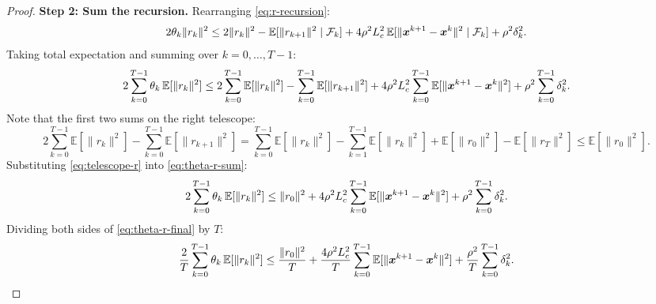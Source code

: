\documentclass[10pt]{article}
\begin{document}
\begin{proof}
\medskip\noindent\textbf{Step 2: Sum the recursion.}
Rearranging \eqref{eq:r-recursion}:
\begin{equation}
  2\theta_k\|r_k\|^2
  \leq 2\|r_k\|^2 - \mathbb{E}[\|r_{k+1}\|^2 \mid \mathcal{F}_k]
       + 4\rho^2 L_c^2\,\mathbb{E}[\|\bm{x}^{k+1}-\bm{x}^k\|^2 \mid \mathcal{F}_k]
       + \rho^2\delta_k^2.
\end{equation}
Taking total expectation and summing over $k = 0,\ldots,T-1$:
\begin{equation}\label{eq:theta-r-sum}
  2\sum_{k=0}^{T-1}\theta_k\,\mathbb{E}[\|r_k\|^2]
  \leq 2\sum_{k=0}^{T-1}\mathbb{E}[\|r_k\|^2]
       - \sum_{k=0}^{T-1}\mathbb{E}[\|r_{k+1}\|^2]
       + 4\rho^2 L_c^2\sum_{k=0}^{T-1}\mathbb{E}[\|\bm{x}^{k+1}-\bm{x}^k\|^2]
       + \rho^2\sum_{k=0}^{T-1}\delta_k^2.
\end{equation}
Note that the first two sums on the right telescope:
\begin{equation}\label{eq:telescope-r}
  2\sum_{k=0}^{T-1}\mathbb{E}[\|r_k\|^2] - \sum_{k=0}^{T-1}\mathbb{E}[\|r_{k+1}\|^2]
  = \sum_{k=0}^{T-1}\mathbb{E}[\|r_k\|^2] - \sum_{k=1}^{T-1}\mathbb{E}[\|r_k\|^2]
    + \mathbb{E}[\|r_0\|^2] - \mathbb{E}[\|r_T\|^2]
  \leq \mathbb{E}[\|r_0\|^2].
\end{equation}
Substituting \eqref{eq:telescope-r} into \eqref{eq:theta-r-sum}:
\begin{equation}\label{eq:theta-r-final}
  2\sum_{k=0}^{T-1}\theta_k\,\mathbb{E}[\|r_k\|^2]
  \leq \|r_0\|^2
       + 4\rho^2 L_c^2\sum_{k=0}^{T-1}\mathbb{E}[\|\bm{x}^{k+1}-\bm{x}^k\|^2]
       + \rho^2\sum_{k=0}^{T-1}\delta_k^2.
\end{equation}
Dividing both sides of \eqref{eq:theta-r-final} by $T$:
  \textcolor{red}{
\begin{equation}\label{eq:feasibility-weighted}
  \frac{2}{T}\sum_{k=0}^{T-1}\theta_k\,\mathbb{E}[\|r_k\|^2]
  \leq \frac{\|r_0\|^2}{T}
       + \frac{4\rho^2 L_c^2}{T}\sum_{k=0}^{T-1}\mathbb{E}[\|\bm{x}^{k+1}-\bm{x}^k\|^2]
       + \frac{\rho^2}{T}\sum_{k=0}^{T-1}\delta_k^2.
\end{equation}}


\end{proof}
\end{document}
